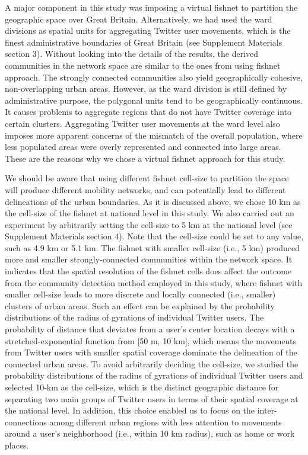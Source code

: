 \documentclass[]{tGIS2e}
\begin{document}
A major component in this study was imposing a virtual fishnet to partition the geographic space over Great Britain.
Alternatively, we had used the ward divisions as spatial units for aggregating Twitter user movements, which is the finest administrative boundaries of Great Britain (see Supplement Materials section 3).
Without looking into the details of the results, the derived communities in the network space are similar to the ones from using fishnet approach.
The strongly connected communities also yield geographically cohesive, non-overlapping urban areas.
However, as the ward division is still defined by administrative purpose, the polygonal units tend to be geographically continuous.
It causes problems to aggregate regions that do not have Twitter coverage into certain clusters.
Aggregating Twitter user movements at the ward level also imposes more apparent concerns of the mismatch of the overall population, where less populated areas were overly represented and connected into large areas.
These are the reasons why we chose a virtual fishnet approach for this study.

We should be aware that using different fishnet cell-size to partition the space will produce different mobility networks, and can potentially lead to different delineations of the urban boundaries.
As it is discussed above, we chose 10 km as the cell-size of the fishnet at national level in this study.
We also carried out an experiment by arbitrarily setting the cell-size to 5 km at the national level (see Supplement Materials section 4).
Note that the cell-size could be set to any value, such as 4.9 km or 5.1 km.
The fishnet with smaller cell-size (i.e., 5 km) produced more and smaller strongly-connected communities within the network space.
It indicates that the spatial resolution of the fishnet cells does affect the outcome from the community detection method employed in this study, where fishnet with smaller cell-size leads to more discrete and locally connected (i.e., smaller) clusters of urban areas.
Such an effect can be explained by the probability distributions of the radius of gyrations of individual Twitter users.
The probability of distance that deviates from a user's center location decays with a stretched-exponential function from [50 m, 10 km], which means the movements from Twitter users with smaller spatial coverage dominate the delineation of the connected urban areas.
To avoid arbitrarily deciding the cell-size, we studied the probability distributions of the radius of gyrations of individual Twitter users and selected 10-km as the cell-size, which is the distinct geographic distance for separating two main groups of Twitter users in terms of their spatial coverage at the national level.
In addition, this choice enabled us to focus on the inter-connections among different urban regions with less attention to movements around a user's neighborhood (i.e., within 10 km radius), such as home or work places.
\end{document}
